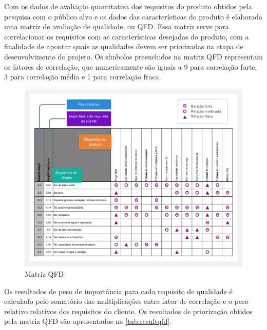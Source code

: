 Com os dados de avaliação quantitativa dos requisitos do produto obtidos pela pesquisa com o público alvo e os dados das características do produto é elaborada uma matriz de  avaliação de qualidade, ou QFD.
Essa matriz serve para correlacionar os requisitos com as características desejadas do produto, com a finalidade de apontar quais as qualidades devem ser priorizadas na etapa de desenvolvimento do projeto.
Os símbolos preenchidos na matriz QFD representam os fatores de correlação, que numericamente são iguais a 9 para correlação forte, 3 para correlação média e 1 para correlação fraca.

\begin{figure}[htb]
	\caption{\label{fig:2032} Matriz QFD}
	\begin{center}
		\includegraphics[width=\textwidth]{pictures/2032.png}
	\end{center}
\end{figure}

Os resultados de peso de importância para cada requisito de qualidade é calculado pelo somatório das multiplicações entre fator de correlação e o peso relativo relativos dos requisitos do cliente.
Os resultados de priorização obtidos pela matriz QFD são apresentados na \autoref{tab:resultqfd}.


